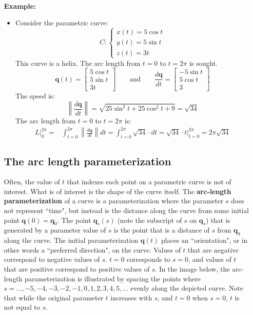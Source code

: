 \documentclass{article}
\begin{document}
\textbf{Example:}
\begin{itemize}
\item Consider the parametric curve:
\[C: \left\{\begin{array}{c} 
x(t) = 5 \cos t \\  
y(t) = 5 \sin t \\ 
z(t) = 3t 
\end{array}\right.\]
This curve is a helix. The arc length from \(t = 0\) to \(t = 2\pi\) is sought.
\[\mathbf{q}(t) = \begin{bmatrix}
5 \cos t \\  
5 \sin t \\ 
3t 
\end{bmatrix} \quad\quad\text{and}\quad\quad \frac{d\mathbf{q}}{dt} = \begin{bmatrix}
-5 \sin t \\  
5 \cos t \\ 
3  
\end{bmatrix}\]
The speed is:
\[\left\|\frac{d\mathbf{q}}{dt}\right\| = \sqrt{25\sin^2 t + 25\cos^2 t + 9} = \sqrt{34}\] 
The arc length from \(t = 0\) to \(t = 2\pi\) is: 
\begin{align*}
L\Big|_0^{2\pi} = & \int_{t = 0}^{2\pi} \left\|\frac{d\mathbf{q}}{dt}\right\|dt 
= \int_{t = 0}^{2\pi} \sqrt{34} \cdot dt 
= \sqrt{34} \cdot t \bigg|_{t = 0}^{2\pi}   
= 2\pi\sqrt{34}
\end{align*} 
\end{itemize}




\subsection*{The arc length parameterization}  

Often, the value of \(t\) that indexes each point on a parametric curve is not of interest. What is of interest is the shape of the curve itself. The {\bf arc-length parameterization} of a curve is a parameterization where the parameter \(s\) does not represent ``time", but instead is the distance along the curve from some initial point \(\mathbf{q}(0) = \mathbf{q}_0\). The point \(\mathbf{q}_s(s)\) (note the subscript of \(s\) on \(\mathbf{q}_s\)) that is generated by a parameter value of \(s\) is the point that is a distance of \(s\) from \(\mathbf{q}_0\) along the curve. The initial parameterization \(\mathbf{q}(t)\) places an ``orientation", or in other words a ``preferred direction", on the curve. Values of \(t\) that are negative correspond to negative values of \(s\). \(t = 0\) corresponds to \(s = 0\), and values of \(t\) that are positive correspond to positive values of \(s\). In the image below, the arc-length parameterization is illustrated by spacing the points where \(s = ..., -5, -4, -3, -2, -1, 0, 1, 2, 3, 4, 5, ...\) evenly along the depicted curve. Note that while the original parameter \(t\) increases with \(s\), and \(t = 0\) when \(s = 0\), \(t\) is not equal to \(s\).   
\end{document}
